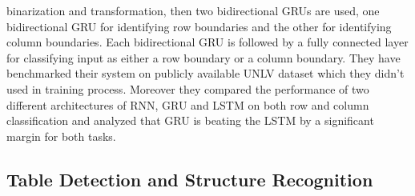 binarization and transformation, then two bidirectional GRUs are used, one bidirectional GRU for identifying row boundaries and the other for identifying column boundaries. Each bidirectional GRU is followed by a fully connected layer for classifying input as either a row boundary or a column boundary. They have benchmarked their system on publicly available UNLV dataset which they didn't used in training process. Moreover they compared the performance of two different architectures of RNN, GRU and LSTM on both row and column classification and analyzed that GRU is beating the LSTM by a significant margin for both tasks.
\subsection{Table Detection and Structure Recognition}
\label{sec:relatedWork_Table_Structure}
